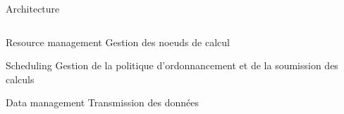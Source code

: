 \documentclass{beamer}
\begin{document}
\begin{frame}{Architecture}
\begin{columns}
	\begin{column}[r]{0.5\linewidth}
        \begin{block}{Resource management}
            Gestion des noeuds de calcul
        \end{block}
        \begin{alertblock}{Scheduling}
             Gestion de la politique d'ordonnancement et de la soumission des calculs
        \end{alertblock}
        \begin{exampleblock}{Data management}
            Transmission des données
        \end{exampleblock}
        
	\end{column}
	\end{columns}
\end{frame}
\end{document}
